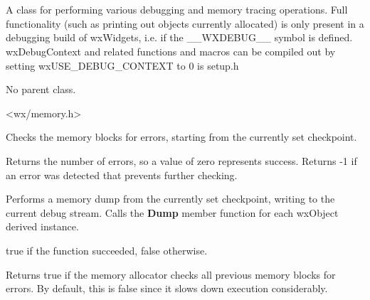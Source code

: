 \section{}\label{wxdebugcontext}

A class for performing various debugging and memory tracing
operations. Full functionality (such as printing out objects
currently allocated) is only present in a debugging build of wxWidgets,
i.e. if the \_\_WXDEBUG\_\_ symbol is defined. wxDebugContext
and related functions and macros can be compiled out by setting
wxUSE\_DEBUG\_CONTEXT to 0 is setup.h


No parent class.


<wx/memory.h>






\label{wxdebugcontextcheck}


Checks the memory blocks for errors, starting from the currently set
checkpoint.


Returns the number of errors,
so a value of zero represents success. Returns -1 if an error
was detected that prevents further checking.

\label{wxdebugcontextdump}


Performs a memory dump from the currently set checkpoint, writing to the
current debug stream. Calls the {\bf Dump} member function for each wxObject
derived instance.


true if the function succeeded, false otherwise.

\label{wxdebugcontextgetcheckprevious}


Returns true if the memory allocator checks all previous memory blocks for errors.
By default, this is false since it slows down execution considerably.

